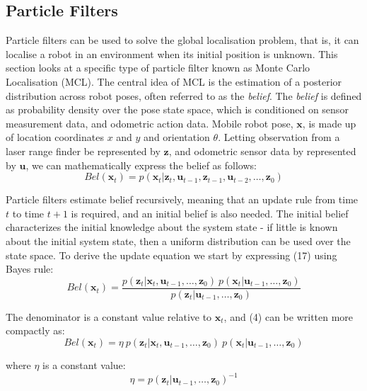 \documentclass[a4paper]{article}
\begin{document}
\subsection{Particle Filters}
Particle filters can be used to solve the global localisation problem, that is, it can localise a robot in an environment when its initial position is unknown. This section looks at a specific type of particle filter known as Monte Carlo Localisation (MCL). The central idea of MCL is the estimation of a posterior distribution across robot poses, often referred to as the \textit{belief}. The \textit{belief} is defined as probability density over the pose state space, which is conditioned on sensor measurement data, and odometric action data. Mobile robot pose, $\mathbf{x}$, is made up of location coordinates $x$ and $y$ and orientation $\theta$. Letting observation from a laser range finder be represented by $\mathbf{z}$, and odometric sensor data by represented by $\mathbf{u}$, we can mathematically express the belief as follows:
\begin{equation}
Bel(\mathbf{x}_t) = p(\mathbf{x}_t | \mathbf{z}_t, \mathbf{u}_{t-1}, \mathbf{z}_{t-1}, \mathbf{u}_{t-2},\ldots,\mathbf{z}_0)
\end{equation}

Particle filters estimate belief recursively, meaning that an update rule from time $t$ to time $t+1$ is required, and an initial belief is also needed. The initial belief characterizes the initial knowledge about the system state - if little is known about the initial system state, then a uniform distribution can be used over the state space. To derive the update equation we start by expressing (17) using Bayes rule:
\begin{equation}
Bel(\mathbf{x}_t) = \frac{p(\mathbf{z}_t | \mathbf{x}_t,\mathbf{u}_{t-1},\ldots,\mathbf{z}_0) \ p(\mathbf{x}_t | \mathbf{u}_{t-1},\ldots,\mathbf{z}_0)}{p(\mathbf{z}_t | \mathbf{u}_{t-1},\ldots,\mathbf{z}_0)}
\end{equation}

The denominator is a constant value relative to $\mathbf{x}_t$, and (4) can be written more compactly as:
\begin{equation}
Bel(\mathbf{x}_t) = \eta \ p(\mathbf{z}_t | \mathbf{x}_t,\mathbf{u}_{t-1},\ldots,\mathbf{z}_0) \ p(\mathbf{x}_t | \mathbf{u}_{t-1},\ldots,\mathbf{z}_0)
\end{equation}

where $\eta$ is a constant value:
\begin{equation}
\eta = p(\mathbf{z}_t | \mathbf{u}_{t-1},\ldots,\mathbf{z}_0)^{-1}
\end{equation}
\end{document}
